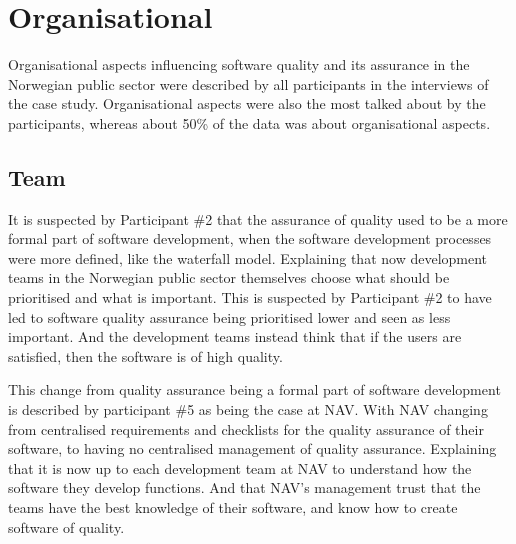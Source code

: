 
\section{Organisational} \label{sec:organisational}
Organisational aspects influencing software quality and its assurance in the Norwegian public sector were described by all participants in the interviews of the case study. Organisational aspects were also the most talked about by the participants, whereas about 50\% of the data was about organisational aspects. 

\subsection{Team} \label{sec:team}
It is suspected by Participant \#2 that the assurance of quality used to be a more formal part of software development, when the software development processes were more defined, like the waterfall model. Explaining that now development teams in the Norwegian public sector themselves choose what should be prioritised and what is important. This is suspected by Participant \#2 to have led to software quality assurance being prioritised lower and seen as less important. And the development teams instead think that if the users are satisfied, then the software is of high quality.


This change from quality assurance being a formal part of software development is described by participant \#5 as being the case at NAV. With NAV changing from centralised requirements and checklists for the quality assurance of their software, to having no centralised management of quality assurance. Explaining that it is now up to each development team at NAV to understand how the software they develop functions. And that NAV's management trust that the teams have the best knowledge of their software, and know how to create software of quality.

